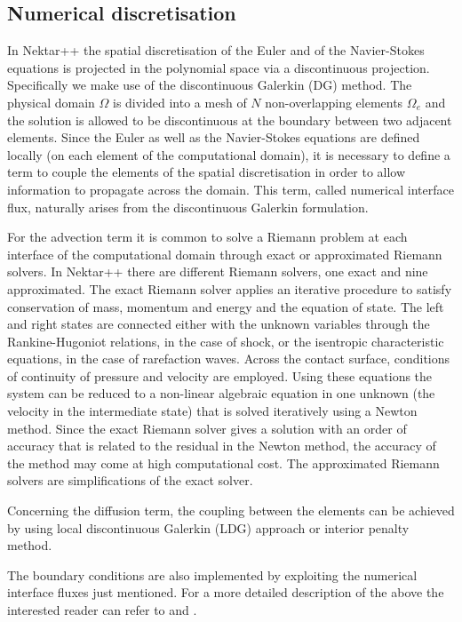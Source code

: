 \subsection{Numerical discretisation}
In Nektar++ the spatial discretisation of the Euler and of the Navier-Stokes
equations is projected in the polynomial space via a discontinuous projection.
Specifically we make use of the discontinuous Galerkin (DG) method.
The physical domain $\Omega$ is divided into a mesh
of $N$ non-overlapping elements $\Omega_{e}$ and the solution is allowed
to be discontinuous at the boundary between two adjacent elements.
Since the Euler as well as the Navier-Stokes equations are defined locally
(on each element of the computational domain), it is necessary to define
a term to couple the elements of the spatial discretisation in order to allow
information to propagate across the domain. This term, called numerical
interface flux, naturally arises from the discontinuous Galerkin formulation.

For the advection term it is common to solve a Riemann problem at each
interface of the computational domain through exact or approximated Riemann
solvers. In Nektar++ there are different Riemann solvers, one exact and nine
approximated. The exact Riemann solver applies an iterative procedure to
satisfy conservation of mass, momentum and energy and the equation of
state. The left and right states are connected either with the unknown variables
through the Rankine-Hugoniot relations, in the case of shock, or the isentropic
characteristic equations, in the case of rarefaction waves. Across the contact
surface, conditions of continuity of pressure and velocity are employed.
Using these equations the system can be reduced to a non-linear algebraic
equation in one unknown (the velocity in the intermediate state) that is solved
iteratively using a Newton method. Since the exact Riemann solver gives
a solution with an order of accuracy that is related to the residual in the
Newton method, the accuracy of the method may come at high computational
cost. The approximated Riemann solvers are simplifications of the exact solver.

Concerning the diffusion term, the coupling between the elements can be achieved
by using local discontinuous Galerkin (LDG) approach or interior penalty method.

The boundary conditions are also implemented by exploiting the numerical
interface fluxes just mentioned.
For a more detailed description of the above the interested reader can refer
to \cite{DeGMen14} and \cite{MenDeG14}.


